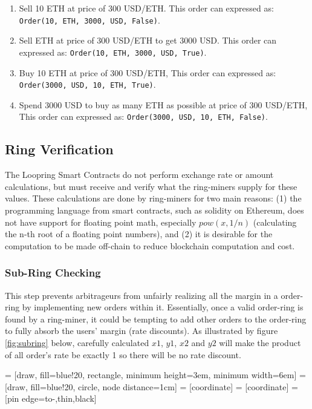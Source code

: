 \documentclass[UTF8,nofonts]{article}
\makeatletter
\newenvironment{figurehere}
 {\def\@captype{figure}}
 {}
\makeatother
\begin{document}
\begin{multicols}{2}
\begin{enumerate}
	\item Sell 10 ETH at price of 300 USD/ETH. This order can expressed as: \verb|Order(10, ETH, 3000, USD, False)|.
	\item Sell ETH at price of 300 USD/ETH to get 3000 USD. This order can expressed as: \verb|Order(10, ETH, 3000, USD, True)|.
	\item Buy 10 ETH at price of 300 USD/ETH, This order can expressed as: \verb|Order(3000, USD, 10, ETH, True)|.
	\item Spend 3000 USD to buy as many ETH as possible at price of 300 USD/ETH, This order can expressed as: \verb|Order(3000, USD, 10, ETH, False)|.
\end{enumerate}



\subsection{Ring Verification\label{sec:ring_verification}}

The Loopring Smart Contracts do not perform exchange rate or amount calculations, but must receive and verify what the ring-miners supply for these values. These calculations are done by ring-miners for two main reasons: (1) the programming language from smart contracts, such as solidity\cite{dannen2017introducing} on Ethereum, does not have support for floating point math, especially $pow(x, 1/n)$ (calculating the n-th root of a floating point numbers), and (2) it is desirable for the computation to be made off-chain to reduce blockchain computation and cost.


\subsubsection{Sub-Ring Checking\label{sec:sub_ring_check}}
This step prevents arbitrageurs from unfairly realizing all the margin in a order-ring by implementing new orders within it. Essentially, once a valid order-ring is found by a ring-miner, it could be tempting to add other orders to the order-ring to fully absorb the users' margin (rate discounts). As illustrated by figure \ref{fig:subring} below, carefully calculated $x1$, $y1$, $x2$ and $y2$ will make the product of all order's rate be exactly 1 so there will be no rate discount. 

\begin{center}
\begin{figurehere}
\centering
{} = [draw, fill=blue!20, rectangle, 
    minimum height=3em, minimum width=6em]
 = [draw, fill=blue!20, circle, node distance=1cm]
 = [coordinate]
 = [coordinate]
 = [pin edge={to-,thin,black}]


\end{figurehere}
\end{center}
\end{multicols}
\end{document}
